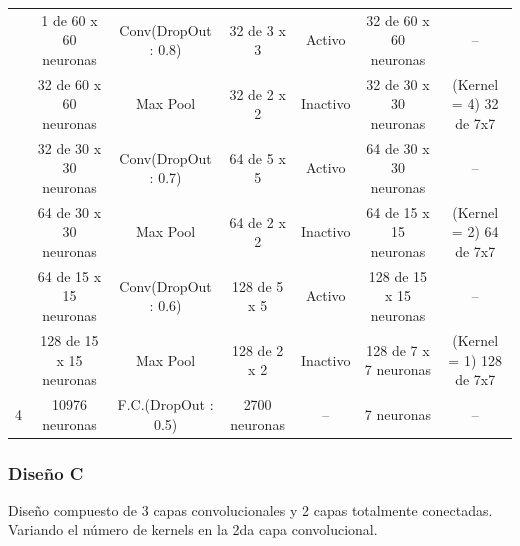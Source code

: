 \begin{itemize}
\begin{table}[H]
\begin{center}
\begin{tabular}{|>{\scriptsize}c|>{\scriptsize}c>{\scriptsize}c>{\scriptsize}c>{\scriptsize}c>{\scriptsize}c|>{\scriptsize}c|}
				 & 1 de 60 x 60 neuronas & Conv(DropOut : 0.8) & 32 de 3 x 3 & Activo & 32 de 60 x 60 neuronas & --\\ 
				\multirow{-2}{*}{1} &  32 de 60 x 60 neuronas &  Max Pool &  32 de 2 x 2 &  Inactivo & 32 de 30 x 30 neuronas & {\cellcolor[HTML]{DAE8FC}(Kernel = 4) 32 de 7x7}\\ \hline
				 & 32 de 30 x 30 neuronas & Conv(DropOut : 0.7) & 64 de 5 x 5 & Activo & 64 de 30 x 30 neuronas & --\\ 
				\multirow{-2}{*}{2} &  64 de 30 x 30 neuronas &  Max Pool &  64 de 2 x 2 &  Inactivo & 64 de 15 x 15 neuronas & {\cellcolor[HTML]{DAE8FC}(Kernel = 2) 64 de 7x7}\\ \hline			
				{\cellcolor[HTML]{ffb3b3}} & 64 de 15 x 15 neuronas & Conv(DropOut : 0.6) & 128 de 5 x 5 & Activo & 128 de 15 x 15 neuronas & --\\ 			
				{\cellcolor[HTML]{ffb3b3} \multirow{-2}{*}{3}} &  128 de 15 x 15 neuronas &  Max Pool &  128 de 2 x 2 &  Inactivo & 128 de 7 x 7 neuronas & {\cellcolor[HTML]{DAE8FC} (Kernel = 1) 128 de 7x7 }\\ \hline
				4 &  {\cellcolor[HTML]{DAE8FC}10976 neuronas} &  F.C.(DropOut : 0.5) &  2700 neuronas &  -- & 7 neuronas & --\\ \hline
				\end{tabular}
				\end{center}
				\end{table}

				\end{itemize}
		\vspace{2.2em}
		\subsubsection{Diseño C} %
			\vspace{-1.2em}
			Diseño compuesto de 3 capas convolucionales y 2 capas totalmente conectadas. Variando el número de kernels en la 2da capa convolucional.
			

